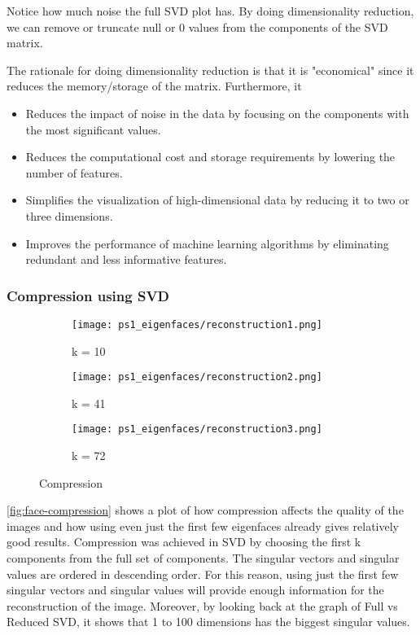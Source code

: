 \documentclass{article} %
\theoremstyle{definition}
\theoremstyle{remark}
\theoremstyle{plain}
\begin{document}
        Notice how much noise the full SVD plot has. By doing dimensionality reduction, we can remove or truncate null or 0 values from the components of the SVD matrix. 
        
        The rationale for doing dimensionality reduction is that it is "economical" since it reduces the memory/storage of the matrix. Furthermore, it

        \begin{itemize}[label={--}]
            \item Reduces the impact of noise in the data by focusing on the components with the most significant values.
            \item Reduces the computational cost and storage requirements by lowering the number of features.
            \item Simplifies the visualization of high-dimensional data by reducing it to two or three dimensions.
            \item Improves the performance of machine learning algorithms by eliminating redundant and less informative features.
        \end{itemize}
    \subsubsection{Compression using SVD}
        \begin{figure}[h!]
            \centering
            \begin{subfigure}{15cm}
                \centering
                \texttt{[image: ps1\_eigenfaces/reconstruction1.png]}
                \caption*{k = 10}
                \label{enter-label}
            \end{subfigure}
            \begin{subfigure}{15cm}
                \centering
                \texttt{[image: ps1\_eigenfaces/reconstruction2.png]}
                \caption*{k = 41}
                \label{enter-label}
            \end{subfigure}
            \begin{subfigure}{15cm}
                \centering
                \texttt{[image: ps1\_eigenfaces/reconstruction3.png]}
                \caption*{k = 72}
                \label{enter-label}
            \end{subfigure}
        \caption{Compression}
        \label{fig:face-compression}
        \end{figure}
        \autoref{fig:face-compression} shows a plot of how compression affects the quality of the images and how using even just the first few eigenfaces already gives relatively good results. Compression was achieved in SVD by choosing the first k components from the full set of components. The singular vectors and singular values are ordered in descending order. For this reason, using just the first few singular vectors and singular values will provide enough information for the reconstruction of the image. Moreover, by looking back at the graph of Full vs Reduced SVD, it shows that 1 to 100 dimensions has the biggest singular values.
\end{document}
